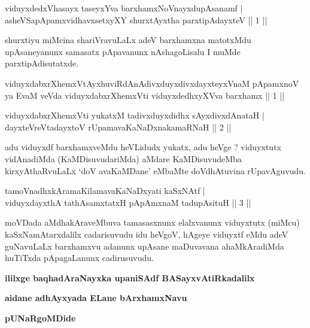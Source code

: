 \begin{shl}
viduyxdedxVhasayx taseyxYva barxhamxNoV\s nayxdupAsanamf | \\
asheVSapApamxvidhavxsetxyXY shurxtAyx\s tha parxtipAdayxteV \hfill ||  1 || 
\end{shl}

\begin{artha}
shurxtiyu miMcina shariVravuLaLx adeV barxhamxna matotxMdu upAsaneyanunx samasatx pApavanunx nAshagoLisalu I muMde parxtipAdisutatxde.
\end{artha}

\begin{shl}
viduyxdabxrXhemxVtAyxhuviRdAnAdivxduyxdivxdayxteyxVnaM pApamxnoV ya EvaM veVda viduyxdabxrXhemxVti viduyxdedhxyXVva barxhamx || 1 ||
\end{shl}


\begin{shl}
viduyxdabxrXhemxVti yukatxM tadivxduyxdidhx sAyxdivxdAnataH | \\
dayxteVreVtadayxtoV rUpamavaKaNaDxnakamaRNaH \hfill ||  2 || 
\end{shl}

\begin{artha}
adu viduyxdf barxhamxveMdu heVLidudx yukatx, adu heVge ? viduyxtutx vidAnadiMda (KaMDisuvudariMda) aMdare KaMDisuvudeMba kirxyAthaRvuLaLx `doV avaKaMDane' eMbaMte doVdhAtuvina rUpavAguvudu.
\end{artha}

\begin{shl}
tamoV\s nadhxkAramaKilamavaKaNaDxyati kaSxNAtf  | \\
viduyxdayxthA tathA\s samxtatxH pApAmxnaM tadupAsituH \hfill ||  3 ||
\end{shl}

\begin{artha}
moVDada aMdhakAraveMbuva tamasasxnunx elalxvanunx viduyxtutx (miMcu) kaSxNamAtarxdalilx cadarisuvudu idu heVgoV, hAgeye viduyxtf eMdu adeV guNavuLaLx barxhamxvu adanunx upAsane maDuvavana ahaMkAradiMda huTiTxda pApagaLanunx cadirusuvudu.
\end{artha}

\begin{center}
{\bf ililxge baqhadAraNayxka upaniSAdf BASayxvAtiRkadalilx}
\smallskip

{\bf aidane adhAyxyada ELane bArxhamxNavu}
\smallskip

{\bf pUNaRgoMDide}
\end{center}

